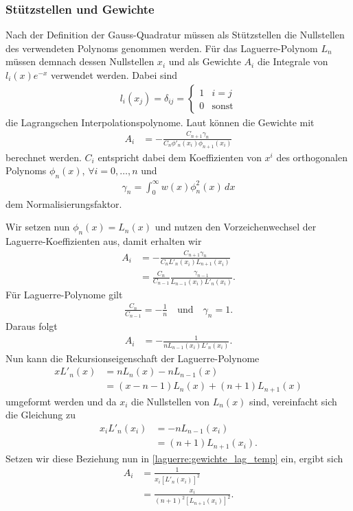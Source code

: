 \subsubsection{Stützstellen und Gewichte}
Nach der Definition der Gauss-Quadratur müssen als Stützstellen die Nullstellen
des verwendeten Polynoms genommen werden.
Für das Laguerre-Polynom $L_n$ müssen demnach dessen Nullstellen $x_i$ und
als Gewichte $A_i$ die Integrale von $l_i(x) e^{-x}$ verwendet werden.
Dabei sind
\begin{align*}
l_i(x_j)
=
\delta_{ij}
=
\begin{cases}
1 & i=j          \\
0 & \text{sonst}
\end{cases}
\end{align*}
die Lagrangschen Interpolationspolynome.
Laut \cite{laguerre:hildebrand2013introduction} können die Gewichte mit
\begin{align*}
A_i
 & =
-\frac{C_{n+1} \gamma_n}{C_n \phi'_n(x_i) \phi_{n+1} (x_i)}
\end{align*}
berechnet werden.
$C_i$ entspricht dabei dem Koeffizienten von $x^i$
des orthogonalen Polynoms $\phi_n(x)$, $\forall i =0,\ldots,n$ und
\begin{align*}
\gamma_n
=
\int_0^\infty w(x) \phi_n^2(x)\,dx
\end{align*}
dem Normalisierungsfaktor.

Wir setzen nun $\phi_n(x) = L_n(x)$ und
nutzen den Vorzeichenwechsel der Laguerre-Koeffizienten aus,
damit erhalten wir
\begin{align*}
A_i
 & =
-\frac{C_{n+1} \gamma_n}{C_n L'_n(x_i) L_{n+1} (x_i)}
\\
 & = \frac{C_n}{C_{n-1}} \frac{\gamma_{n-1}}{L_{n-1}(x_i) L'_n(x_i)}
.
\end{align*}
Für Laguerre-Polynome gilt
\begin{align*}
\frac{C_n}{C_{n-1}}
=
-\frac{1}{n}
\quad \text{und} \quad
\gamma_n
=
1
.
\end{align*}
Daraus folgt
\begin{align}
A_i
 & =
- \frac{1}{n L_{n-1}(x_i) L'_n(x_i)}
\label{laguerre:gewichte_lag_temp}
.
\end{align}
Nun kann die Rekursionseigenschaft der Laguerre-Polynome
\cite{laguerre:hildebrand2013introduction}
\begin{align*}
x L'_n(x)
 & =
n L_n(x) - n L_{n-1}(x)
\\
 & = (x - n - 1) L_n(x) + (n + 1) L_{n+1}(x)
\end{align*}
umgeformt werden und da $x_i$ die Nullstellen von $L_n(x)$ sind,
vereinfacht sich die Gleichung zu
\begin{align*}
x_i L'_n(x_i)
 & =
- n L_{n-1}(x_i)
\\
 & =
(n + 1) L_{n+1}(x_i)
.
\end{align*}
Setzen wir diese Beziehung nun in \eqref{laguerre:gewichte_lag_temp} ein,
ergibt sich
\begin{align}
\nonumber
A_i
 & =
\frac{1}{x_i \left[ L'_n(x_i) \right]^2}
\\
 & =
\frac{x_i}{(n+1)^2 \left[ L_{n+1}(x_i) \right]^2}
.
\label{laguerre:quadratur_gewichte}
\end{align}

